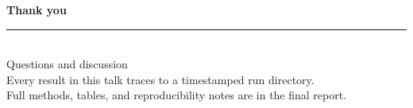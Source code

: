 \documentclass[aspectratio=169,11pt]{beamer}
\begin{document}
{
\begin{frame}
  \vfill
  \begin{center}
    {\Large\bfseries\textcolor{ink}{Thank you}}\\[1.0em]
    {\color{headerbg}\rule{0.5\linewidth}{1pt}}\\[1.0em]
    {\normalsize Questions and discussion}\\[1.6em]
    {\footnotesize Every result in this talk traces to a timestamped run
    directory.\\
    Full methods, tables, and reproducibility notes are in the final report.}
  \end{center}
  \vfill
\end{frame}}
\end{document}
